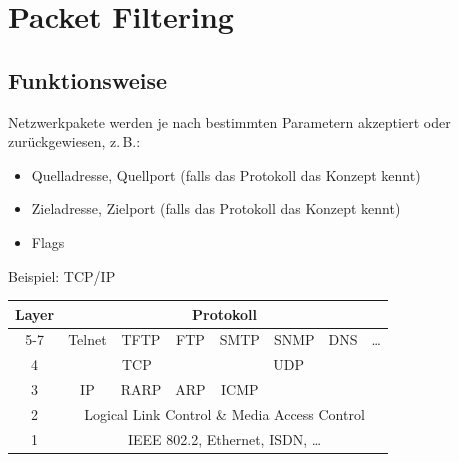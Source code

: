 \section{Packet Filtering}%
\label{sec:packet_filtering}

\subsection{Funktionsweise}%

Netzwerkpakete werden je nach bestimmten Parametern akzeptiert oder zurückgewiesen,
z.\,B.:
\begin{itemize}
  \item Quelladresse, Quellport (falls das Protokoll das Konzept kennt)
  \item Zieladresse, Zielport (falls das Protokoll das Konzept kennt)
  \item Flags
\end{itemize}

Beispiel: TCP/IP
\begin{center}
  \begin{tabular}{cccccccc}
    \toprule
    \textbf{Layer} & \multicolumn{7}{c}{\textbf{Protokoll}}\\
    \midrule
    5-7 & Telnet & TFTP & FTP & SMTP & SNMP & DNS & \dots\\
    \midrule
    4 & \multicolumn{3}{c}{TCP} & \multicolumn{3}{c}{UDP}\\
    \midrule
    3 & IP & RARP & ARP & ICMP\\
    \midrule
    2 & \multicolumn{7}{c}{Logical Link Control \& Media Access Control}\\
    \midrule
    1 & \multicolumn{7}{c}{IEEE 802.2, Ethernet, ISDN, \dots}\\
    \bottomrule
  \end{tabular}
\end{center}

